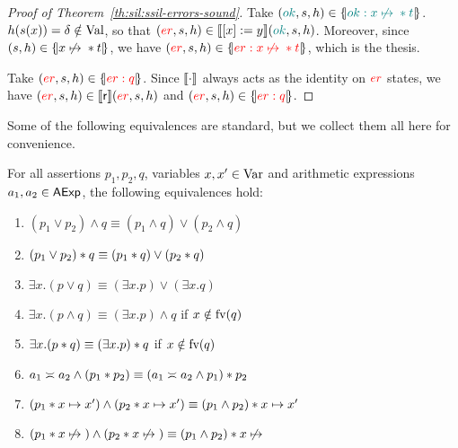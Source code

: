 \begin{proof}[Proof of Theorem~\ref{th:sil:ssil-errors-sound}]
	Take $(\textcolor{teal}{ok}, s, h) \in \{\hspace{-2pt}|\textcolor{teal}{ok: x \not\mapsto{}{} * t}|\hspace{-2pt}\}$. $h(s(x)) = \delta \notin \text{Val}$, so that $(\textcolor{red}{er}, s, h) \in \llbracket[x] := y\rrbracket (\textcolor{teal}{ok}, s, h)$. Moreover, since $(s, h) \in \{\hspace{-2pt}|x \not\mapsto{}{} * t|\hspace{-2pt}\}$, we have $(\textcolor{red}{er}, s, h) \in \{\hspace{-2pt}|\textcolor{red}{er: x \not\mapsto{}{} * t}|\hspace{-2pt}\}$, which is the thesis.

	Take $(\textcolor{red}{er}, s, h) \in \{\hspace{-2pt}|\textcolor{red}{er: q}|\hspace{-2pt}\}$. Since $\llbracket\cdot\rrbracket$ always acts as the identity on $\textcolor{red}{er}$ states, we have $(\textcolor{red}{er}, s, h) \in \llbracket\mathsf{r}\rrbracket (\textcolor{red}{er}, s, h)$ and $(\textcolor{red}{er}, s, h) \in \{\hspace{-2pt}|\textcolor{red}{er: q}|\hspace{-2pt}\}$.
\end{proof}

Some of the following equivalences are standard, but we collect them all here for convenience.
\begin{lemma}\label{lmm:app:asl-equivalences}
	For all assertions $p_1, p_2, q$, variables $x, x' \in \text{Var}$ and arithmetic expressions $a_1, a_2 \in \mathsf{AExp}$, the following equivalences hold:
	\begin{enumerate}
		\item $(p_1 \lor p_2) \land q \equiv (p_1 \land q) \lor (p_2 \land q)$
		\item $(p_1 \lor p_2) * q \equiv (p_1 * q) \lor (p_2 * q)$
		\item $\exists x. (p \lor q) \equiv (\exists x. p) \lor (\exists x. q)$
		\item $\exists x. (p \land q) \equiv (\exists x. p) \land q$ \quad if $x \notin \text{fv}(q)$
		\item $\exists x. (p * q) \equiv (\exists x. p) * q$ \quad if $x \notin \text{fv}(q)$
		\item $a_1 \asymp a_2 \land (p_1 * p_2) \equiv (a_1 \asymp a_2 \land p_1) * p_2$
		\item $(p_1 * x \mapsto x') \land (p_2 * x \mapsto x') \equiv (p_1 \land p_2) * x \mapsto x'$
		\item $(p_1 * x \not\mapsto{}) \land (p_2 * x \not\mapsto{}) \equiv (p_1 \land p_2) * x \not\mapsto{}$
	\end{enumerate}
\end{lemma}
